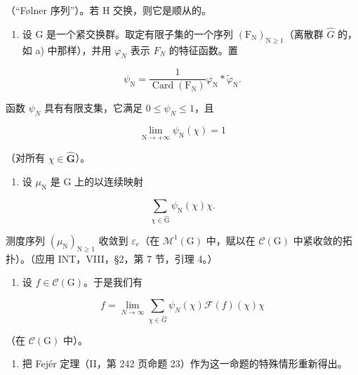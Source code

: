 （“Følner 序列”）。若 H 交换，则它是顺从的。

\begin{enumerate}
\def\labelenumi{\alph{enumi})}
\setcounter{enumi}{1}
\tightlist
\item
  设 G 是一个紧交换群。取定有限子集的一个序列 \((\mathrm{F}_{\mathrm{N}})_{\mathrm{N}\geqslant1}\)（离散群 \(\widehat{G}\) 的，如 a) 中那样），并用 \(\varphi_{N}\) 表示 \(F_{N}\) 的特征函数。置
\end{enumerate}

\[
\psi_ {\mathrm{N}} = \frac {1}{\operatorname{Card} \left(\mathrm{F} _ {\mathrm{N}}\right)} \varphi_ {\mathrm{N}} * \widetilde {\varphi} _ {\mathrm{N}}.
\]

函数 \(\psi_{N}\) 具有有限支集，它满足 \(0 \leqslant \psi_{N} \leqslant 1\)，且

\[
\lim _ {\mathrm{N} \to + \infty} \psi_ {\mathrm{N}} (\chi) = 1
\]

（对所有 \(\chi\in\widehat{\mathbf{G}}\)）。

\begin{enumerate}
\def\labelenumi{\alph{enumi})}
\setcounter{enumi}{2}
\tightlist
\item
  设 \(\mu_{\mathrm{N}}\) 是 G 上的以连续映射
\end{enumerate}

\[
\sum_ {\chi \in \widehat {\mathrm{G}}} \psi_ {\mathrm{N}} (\chi) \chi .
\]

测度序列 \((\mu_{\mathrm{N}})_{\mathrm{N}\geqslant1}\) 收敛到 \(\varepsilon_{e}\)（在 \(\mathcal{M}^{1}(\mathrm{G})\) 中，赋以在 \(\mathcal{C}(\mathrm{G})\) 中紧收敛的拓扑）。（应用 INT，VIII，§2，第 7 节，引理 4。）

\begin{enumerate}
\def\labelenumi{\alph{enumi})}
\setcounter{enumi}{3}
\tightlist
\item
  设 \(f\in \mathcal{C}(\mathrm{G})\)。于是我们有
\end{enumerate}

\[
f = \lim _ {N \to \infty} \sum_ {\chi \in \widehat {G}} \psi_ {N} (\chi) \mathcal {F} (f) (\chi) \chi
\]

（在 \(\mathcal{C}(\mathrm{G})\) 中）。

\begin{enumerate}
\def\labelenumi{\alph{enumi})}
\setcounter{enumi}{4}
\tightlist
\item
  把 Fejér 定理（II，第 242 页命题 23）作为这一命题的特殊情形重新得出。
\end{enumerate}

